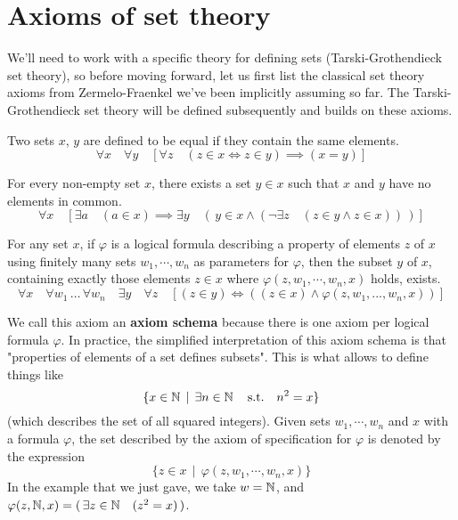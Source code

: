 \section{Axioms of set theory} \label{axioms-of-set-theory}

We'll need to work with a specific theory for defining sets (Tarski-Grothendieck set theory), so before moving forward, let us first list the classical set theory axioms from Zermelo-Fraenkel we've been implicitly assuming so far. The Tarski-Grothendieck set theory will be defined subsequently and builds on these axioms.
\\

\begin{axiom} \label{axiom-of-extensionality}
    Two sets $x$, $y$ are defined to be equal if they contain the same elements. 
    \[
        \forall x \quad \forall y \quad [ \forall z \quad ( z \in x \Leftrightarrow z \in y) \implies (x = y)]
    \]
\end{axiom}

\begin{axiom} \label{axiom-of-regularity}
    For every non-empty set $x$, there exists a set $y \in x$ such that $x$ and $y$ have no elements in common.
    \[
        \forall x \quad [ \exists a \quad (a\in x) \implies \exists y \quad ( \, y \in x \land (\lnot \exists z \quad (z \in y \land z \in x)) \, ) ]
    \]
\end{axiom}

\begin{axiom} \label{axiom-schema-of-specification}
    For any set $x$, if $\varphi$ is a logical formula describing a property of elements $z$ of $x$ using finitely many sets $w_1, \cdots, w_n$ as parameters for $\varphi$, then the subset $y$ of $x$, containing exactly those elements $z \in x$ where $\varphi(z,w_1,\cdots,w_n,x)$ holds, exists. 
    \[
        \forall x \quad \forall w_1 \, \ldots \, \forall w_n \quad \exists y \quad \forall z \quad [ (z \in y) \iff ( (z \in x) \land \varphi(z,w_1,...,w_n,x)) ]    
    \]
\end{axiom}

\begin{remark}
    We call this axiom an \textbf{axiom schema} because there is one axiom per logical formula $\varphi$. In practice, the simplified interpretation of this axiom schema is that "properties of elements of a set defines subsets". This is what allows to define things like
    \[
        \{ x \in \operatorname{\mathbb N} \, \mid \, \exists n \in \operatorname{\mathbb N} \quad \text{s.t.} \quad n^2 = x \}
    \]
    (which describes the set of all squared integers). Given sets $w_1,\cdots,w_n$ and $x$ with a formula $\varphi$, the set described by the axiom of specification for $\varphi$ is denoted by the expression
    \[
        \{ z \in x \, \mid \, \varphi(z,w_1,\cdots,w_n,x) \}    
    \]
    In the example that we just gave, we take $w = \operatorname{\mathbb N}$, and $\varphi(z,\operatorname{\mathbb N},x) = ( \, \exists z \in \operatorname{\mathbb N} \quad (z^2 = x) \, )$. 
\end{remark}

